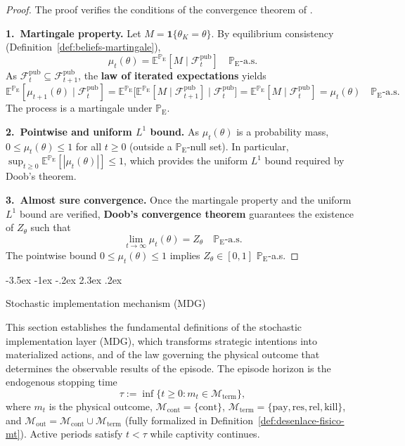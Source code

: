 \documentclass[12pt]{article}
\makeatletter
\numberwithin{equation}{section}
\numberwithin{table}{section}
\theoremstyle{definition}
\newcommand{\E}{\mathbb{E}}
\newcommand{\ProbE}{\mathbb{P}_{\mathrm{E}}}
\renewcommand\section{\@startsection {section}{1}{\z@}%
                                   {-3.5ex \@plus -1ex \@minus -.2ex}%
                                   {2.3ex \@plus.2ex}%
                                   {\normalfont\Large\bfseries\raggedright}}
\makeatother
\begin{document}
\begin{proof}
The proof verifies the conditions of the convergence theorem of
\citet{Doob1953Stochastic,Williams1991Martingales,Shiryaev2019Probability}.

\smallskip
\noindent\textbf{1.~Martingale property.}
Let $M=\mathbf{1}\{\theta_K=\theta\}$. By equilibrium consistency
(Definition~\ref{def:beliefs-martingale}),
\[
\mu_t(\theta)=\E^{\ProbE}[M\mid\mathcal{F}_t^{\mathrm{pub}}]\quad\ProbE\text{-a.s.}
\]
As $\mathcal{F}_t^{\mathrm{pub}}\subseteq\mathcal{F}_{t+1}^{\mathrm{pub}}$,
the \textbf{law of iterated expectations} yields
\[
\E^{\ProbE}[\mu_{t+1}(\theta)\mid\mathcal{F}_t^{\mathrm{pub}}]
=\E^{\ProbE}\!\bigl[\E^{\ProbE}[M\mid\mathcal{F}_{t+1}^{\mathrm{pub}}]
                     \mid\mathcal{F}_t^{\mathrm{pub}}\bigr]
=\E^{\ProbE}[M\mid\mathcal{F}_t^{\mathrm{pub}}]
=\mu_t(\theta)\quad\ProbE\text{-a.s.}
\]
The process is a martingale under $\ProbE$.

\smallskip
\noindent\textbf{2.~Pointwise and uniform $L^1$ bound.}
As $\mu_t(\theta)$ is a probability mass,
$0\le\mu_t(\theta)\le 1$ for all $t\ge 0$ (outside a
$\ProbE$-null set). In particular,
$\sup_{t\ge 0}\E^{\ProbE}[|\mu_t(\theta)|]\le 1$, which provides the
uniform $L^1$ bound required by Doob's theorem.

\smallskip
\noindent\textbf{3.~Almost sure convergence.}
Once the martingale property and the uniform $L^1$ bound are verified,
\textbf{Doob's convergence theorem} guarantees the existence of
$Z_\theta$ such that
\[
\lim_{t\to\infty}\mu_t(\theta)=Z_\theta\quad\ProbE\text{-a.s.}
\]
The pointwise bound $0\le\mu_t(\theta)\le 1$ implies $Z_\theta\in[0,1]$
$\ProbE$-a.s.
\end{proof}

\section{Stochastic implementation mechanism (MDG)}
\label{sec:mdg}

\noindent This section establishes the fundamental definitions of the
stochastic implementation layer (MDG), which transforms strategic intentions
into materialized actions, and of the law governing the physical outcome that
determines the observable results of the episode. The episode horizon is the
endogenous stopping time
\begin{equation}
\label{eq:stopping-time}
\tau:=\inf\{t\ge 0:m_t\in\mathcal{M}_{\mathrm{term}}\},
\end{equation}
where $m_t$ is the physical outcome,
$\mathcal{M}_{\mathrm{cont}}=\{\mathrm{cont}\}$,
$\mathcal{M}_{\mathrm{term}}=\{\mathrm{pay},\mathrm{res},\mathrm{rel},\mathrm{kill}\}$,
and $\mathcal{M}_{\mathrm{out}}=\mathcal{M}_{\mathrm{cont}}\cup\mathcal{M}_{\mathrm{term}}$
(fully formalized in Definition~\ref{def:desenlace-fisico-mt}). Active
periods satisfy $t<\tau$ while captivity continues.
\end{document}
